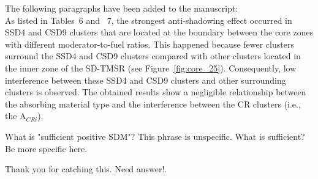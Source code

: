 \documentclass[answers,11pt]{exam}
\begin{document}
\begin{questions}
\begin{solution}
	The following paragraphs have been added to the manuscript:\\
	
	As listed in Tables~6 and ~7, the strongest anti-shadowing effect occurred in 
	SSD4 and CSD9 clusters that are located at the boundary between the core zones 
	with different moderator-to-fuel ratios. This happened because fewer clusters surround the SSD4 and CSD9 clusters compared with other clusters located in the inner zone of the SD-TMSR (see Figure~\ref{fig:core_25}). Consequently, low interference between these SSD4 and CSD9 clusters and other surrounding clusters is observed. The obtained results show a negligible relationship between the absorbing material type and the interference between the CR clusters (i.e., the A$_{CRi}$).
	

\end{solution}
\question What is "sufficient positive SDM"? This phrase is unspecific. What is sufficient? Be more specific here.
\begin{solution}
	Thank you for catching this. Need answer!.

\end{solution}

        
        
\end{questions}


\end{document}
